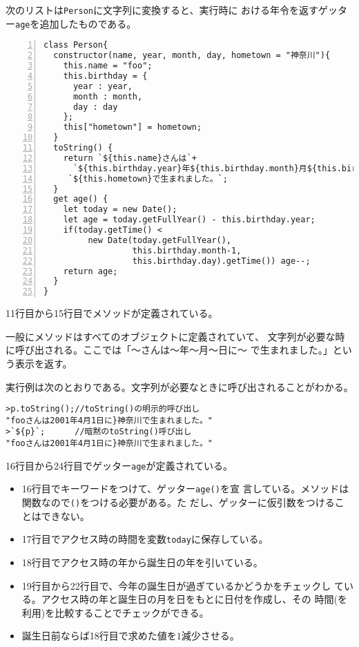 \begin{Exec}\upshape\label{PersonWidthGetter}
次のリストは\texttt{Person}に文字列に変換すると、実行時に
 おける年令を返すゲッター\texttt{age}を追加したものである。
\begin{Verbatim}[numbers=left]
class Person{
  constructor(name, year, month, day, hometown = "神奈川"){
    this.name = "foo";
    this.birthday = {
      year : year,
      month : month,
      day : day
    };
    this["hometown"] = hometown;
  }
  toString() {
    return `${this.name}さんは`+
      `${this.birthday.year}年${this.birthday.month}月${this.birthday.day}日に` +
     `${this.hometown}で生まれました。`;
  }
  get age() {
    let today = new Date();
    let age = today.getFullYear() - this.birthday.year;
    if(today.getTime() <
         new Date(today.getFullYear(),
                  this.birthday.month-1,
                  this.birthday.day).getTime()) age--;
    return age;
  }
}
\end{Verbatim}
 11行目から15行目でメソッドが定義されている。

 一般にメソッドはすべてのオブジェクトに定義されていて、
 文字列が必要な時に呼び出される。ここでは「～さんは～年～月～日に～
        で生まれました。」という表示を返す。

実行例は次のとおりである。文字列が必要なときに呼び出されることがわかる。
\begin{Verbatim}
>p.toString();//toString()の明示的呼び出し
"fooさんは2001年4月1日に}神奈川で生まれました。"
>`${p}`;      //暗黙のtoString()呼び出し
"fooさんは2001年4月1日に}神奈川で生まれました。"
\end{Verbatim}
 16行目から24行目でゲッター\texttt{age}が定義されている。
 \begin{itemize}
 \item 16行目でキーワードをつけて、ゲッター\texttt{age()}を宣
       言している。メソッドは関数なので\texttt{()}をつける必要がある。た
       だし、ゲッターに仮引数をつけることはできない。
 \item 17行目でアクセス時の時間を変数\texttt{today}に保存している。
 \item 18行目でアクセス時の年から誕生日の年を引いている。
 \item 19行目から22行目で、今年の誕生日が過ぎているかどうかをチェックし
       ている。アクセス時の年と誕生日の月を日をもとに日付を作成し、その
       時間(を利用)を比較することでチェックができる。
 \item 誕生日前ならば18行目で求めた値を$1$減少させる。
 \end{itemize}
\end{Exec}
